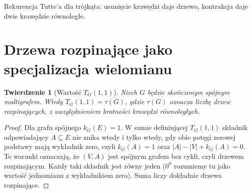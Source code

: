\documentclass[11pt,a4paper]{report}
\numberwithin{equation}{section}
\theoremstyle{plain}
\newtheorem{twierdzenie}{Twierdzenie}[section]
\theoremstyle{definition}
\theoremstyle{remark}
\begin{document}
\begin{center}

{\footnotesize Rekurencja Tutte'a dla trójkąta: usunięcie krawędzi
daje drzewo, kontrakcja daje dwie krawędzie równoległe.}
\end{center}

\section{Drzewa rozpinające jako specjalizacja wielomianu}
\label{sec:tg-tutte-trees}

\begin{twierdzenie}[Wartość $T_G(1,1)$]
Niech $G$ będzie skończonym spójnym multigrafem.
Wtedy $T_G(1,1)=\tau(G)$, gdzie $\tau(G)$ oznacza
liczbę drzew rozpinających, z uwzględnieniem krotności
krawędzi równoległych.
\end{twierdzenie}

\begin{proof}
Dla grafu spójnego $k_G(E)=1$. W sumie definiującej
$T_G(1,1)$ składnik odpowiadający $A\subseteq E$
nie znika wtedy i tylko wtedy, gdy obie potęgi zerowej
podstawy mają wykładnik zero, czyli
$k_G(A)=1$ oraz $|A|-|V|+k_G(A)=0$.
Te warunki oznaczają, że $(V,A)$ jest spójnym grafem
bez cykli, czyli drzewem rozpinającym. Każdy taki
składnik jest równy jeden ($0^0$ rozumiemy tu
jako wartość jednomianu z wykładnikiem zero).
Suma liczy dokładnie drzewa rozpinające.
\end{proof}
\end{document}
